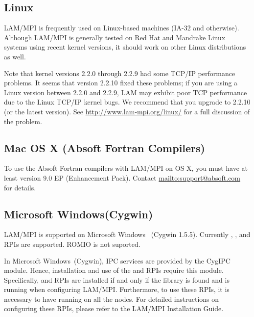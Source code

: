 
\subsection{Linux}

LAM/MPI is frequently used on Linux-based machines (IA-32 and
otherwise).  Although LAM/MPI is generally tested on Red Hat and
Mandrake Linux systems using recent kernel versions, it should work on
other Linux distributions as well.

Note that kernel versions 2.2.0 through 2.2.9 had some TCP/IP
performance problems.  It seems that version 2.2.10 fixed these
problems; if you are using a Linux version between 2.2.0 and 2.2.9,
LAM may exhibit poor TCP performance due to the Linux TCP/IP kernel
bugs.  We recommend that you upgrade to 2.2.10 (or the latest
version).
See \url{http://www.lam-mpi.org/linux/} for a full discussion of the
problem.


\subsection{Mac OS X (Absoft Fortran Compilers)}



To use the Absoft Fortran compilers with LAM/MPI on OS X, you must
have at least version 9.0 EP (Enhancement Pack).  Contact
\url{mailto:support@absoft.com} for details.



\subsection{Microsoft Windows\trademark (Cygwin)}

LAM/MPI is supported on Microsoft Windows \trademark\ (Cygwin 1.5.5).
Currently , ,  and  RPIs are
supported. ROMIO is not suported.

In Microsoft Windows\trademark\ (Cygwin), IPC services are provided by
the CygIPC module.  Hence, installation and use of the 
 and  RPIs require this module.
Specifically,  and  RPIs are installed if and only if
the library  is found and  is
running when configuring LAM/MPI.  Furthermore, to use these RPIs,
it is necessary to have  running on all the nodes.
For detailed instructions on configuring these RPIs, please refer 
to the LAM/MPI Installation Guide.

